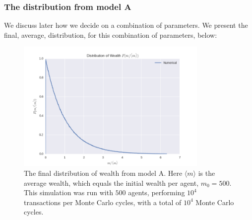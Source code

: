 \documentclass[a4paper, 10pt]{article}
\begin{document}
\subsubsection{The distribution from model A}

We discuss later how we decide on a combination of parameters. We present the final, average, distribution, for this combination of parameters, below:
\begin{figure}[!ht]
\centering
\includegraphics[height=2.5in]{distLamb0.png}
\caption{The final distribution of wealth from model A. Here $\langle m \rangle$ is the average wealth, which equals the initial wealth per agent, $m_0=500$. This simulation was run with $500$ agents, performing $10^4$ transactions per Monte Carlo cycles, with a total of $10^4$ Monte Carlo cycles.}\label{fig:ModelA_final_distribution}
\end{figure}
\end{document}
